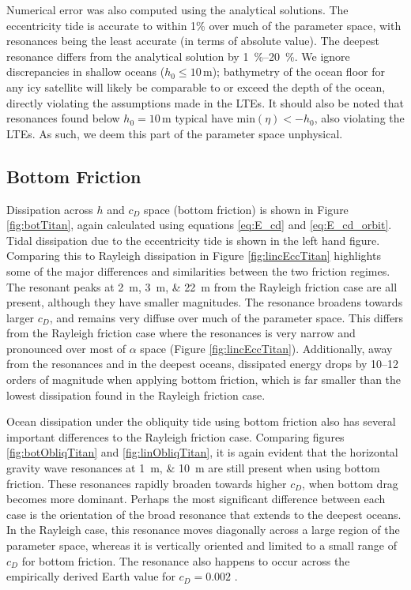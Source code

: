 Numerical error was also computed using the analytical solutions. The eccentricity tide is accurate to within 1\% over much of the parameter space, with resonances being the least accurate (in terms of absolute value). The deepest resonance differs from the analytical solution by \SIrange{1}{20}{\percent}. We ignore discrepancies in shallow oceans ($h_0 \leq 10 \, \si{\metre}$); bathymetry of the ocean floor for any icy satellite will likely be comparable to or exceed the depth of the ocean, directly violating the assumptions made in the LTEs. It should also be noted that resonances found below $h_0 = 10 \, \si{\metre}$ typical have $\text{min} (\eta) < - h_0$, also violating the LTEs. As such, we deem this part of the parameter space unphysical.

\subsection{Bottom Friction \label{subsec:botTitan}}

Dissipation across $h$ and $c_D$ space (bottom friction) is shown in Figure \ref{fig:botTitan}, again calculated using equations \ref{eq:E_cd} and \ref{eq:E_cd_orbit}. Tidal dissipation due to the eccentricity tide is shown in the left hand figure. Comparing this to Rayleigh dissipation in Figure \ref{fig:lincEccTitan} highlights some of the major differences and similarities between the two friction regimes. The resonant peaks at \SIlist{2;3;22}{\metre} from the Rayleigh friction case are all present, although they have smaller magnitudes. The resonance broadens towards larger $c_D$, and remains very diffuse over much of the parameter space. This differs from the Rayleigh friction case where the resonances is very narrow and pronounced over most of $\alpha$ space (Figure \ref{fig:lincEccTitan}). Additionally, away from the resonances and in the deepest oceans, dissipated energy drops by \numrange{10}{12} orders of magnitude when applying bottom friction, which is far smaller than the lowest dissipation found in the Rayleigh friction case.  

Ocean dissipation under the obliquity tide using bottom friction also has several important differences to the Rayleigh friction case. Comparing figures \ref{fig:botObliqTitan} and \ref{fig:linObliqTitan}, it is again evident that the horizontal gravity wave resonances at \SIlist{1;10}{\metre} are still present when using bottom friction. These resonances rapidly broaden towards higher $c_D$, when bottom drag becomes more dominant. Perhaps the most significant difference between each case is the orientation of the broad resonance that extends to the deepest oceans. In the Rayleigh case, this resonance moves diagonally across a large region of the parameter space, whereas it is vertically oriented and limited to a small range of $c_D$ for bottom friction. The resonance also happens to occur across the empirically derived Earth value for $c_D = 0.002$ \citep[e.g.,][]{sohl1995tidal,egbert2001estimates}.

